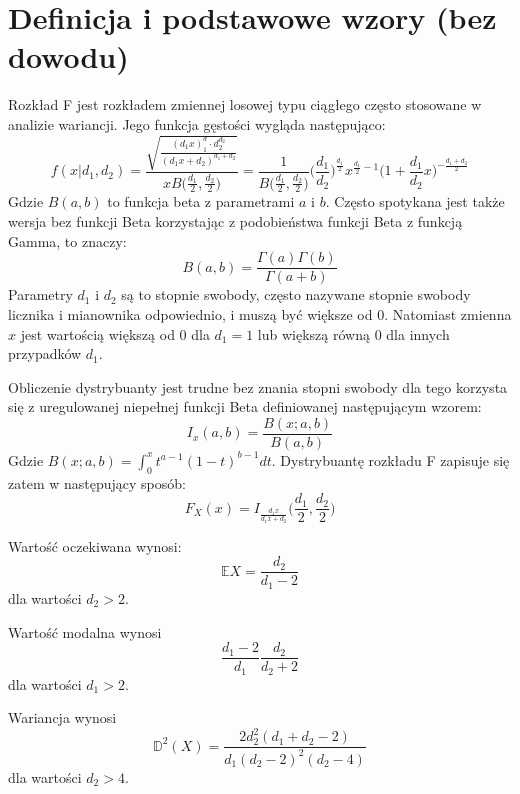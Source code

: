 \documentclass{article}
\begin{document}
{\section{Definicja i podstawowe wzory (bez dowodu)}
Rozkład F jest rozkładem zmiennej losowej typu ciągłego często stosowane w analizie wariancji. Jego funkcja gęstości wygląda następująco:
\[
f(x|d_1,d_2) = \frac{\sqrt{ \frac{(d_1x)^d_1\cdot d_2^{d_2}}{(d_1x+d_2)^{d_1+d_2} }}}{x B\big( \frac{d_1}{2}, \frac{d_2}{2} \big)} =
\frac{1}{ B\big( \frac{d_1}{2}, \frac{d_2}{2} \big)} \Big( \frac{d_1}{d_2}\Big)^{\frac{d_1}{2}} x^{\frac{d_1}{2}-1} \Big(1 + \frac{d_1}{d_2}x \Big)^{-\frac{d_1+d_2}{2}}
\]
Gdzie $B(a,b)$ to funkcja beta z parametrami $a$ i $b$. Często spotykana jest także wersja bez funkcji Beta korzystając z podobieństwa funkcji Beta z funkcją Gamma, to znaczy:
\[
B(a,b) = \frac{\Gamma(a)\Gamma(b)}{\Gamma(a+b)}
\]
Parametry $d_1$ i $d_2$ są to stopnie swobody, często nazywane stopnie swobody licznika i mianownika odpowiednio, i muszą być większe od 0. Natomiast zmienna $x$ jest wartością większą od 0 dla $d_1 = 1$ lub większą równą 0 dla innych przypadków $d_1$. \\ \par
Obliczenie dystrybuanty jest trudne bez znania stopni swobody dla tego korzysta się z uregulowanej niepełnej funkcji Beta definiowanej następującym wzorem:
\[
I_x(a,b) = \frac{B(x;a,b)}{B(a,b)}
\]
Gdzie $B(x;a,b) = \int_0^x t^{a-1}(1-t)^{b-1}dt$.
Dystrybuantę rozkładu F zapisuje się zatem w następujący sposób:
\[
F_X(x) = I_{\frac{d_1x}{d_1x+d_2}} \Big( \frac{d_1}{2}, \frac{d_2}{2} \Big)
\]

Wartość oczekiwana wynosi:
$$\mathbb{E}X = \frac{d_2}{d_1-2}$$ 
dla wartości $d_2 > 2$. \par
Wartość modalna wynosi 
$$\frac{d_1-2}{d_1}\frac{d_2}{d_2+2}$$
dla wartości $d_1 > 2$. \par
Wariancja wynosi 
$$\mathbb{D}^2(X) = \frac{2d_2^2(d_1+d_2-2)}{d_1(d_2-2)^2(d_2-4)}$$
dla wartości $d_2 > 4$.

\newpage
}
\end{document}
